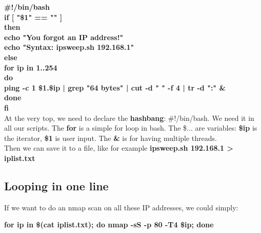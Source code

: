 \documentclass[11pt,a4paper]{article}
\begin{document}
\indent \textbf{\#!/bin/bash}\\

\indent \textbf{if [ "\$1" == "" ]}\\
\indent \textbf{then}\\
\indent \textbf{echo "You forgot an IP address!"}\\
\indent \textbf{echo "Syntax: ipsweep.sh 192.168.1"}\\

\indent \textbf{else}\\
\indent \textbf{for ip in {1..254}}\\
\indent \textbf{do}\\
\indent \textbf{  ping -c 1 \$1.\$ip | grep "64 bytes" | cut -d " " -f 4 | tr -d ":" \&}\\
\indent \textbf{done}\\
\indent \textbf{fi}\\

At the very top, we need to declare the \textbf{hashbang}: \#!/bin/bash. We need it in all our scripts. The \textbf{for} is a simple for loop in bash. The \$... are variables: \textbf{\$ip} is the iterator, \textbf{\$1} is user input. The \textbf{\&} is for having multiple threads.\\

Then we can save it to a file, like for example \textbf{ipsweep.sh 192.168.1 > iplist.txt}

\subsection{Looping in one line}
If we want to do an nmap scan on all these IP addresses, we could simply:\\
\begin{center}
\textbf{for ip in \$(cat iplist.txt); do nmap -sS -p 80 -T4 \$ip; done }
\end{center}
\end{document}
